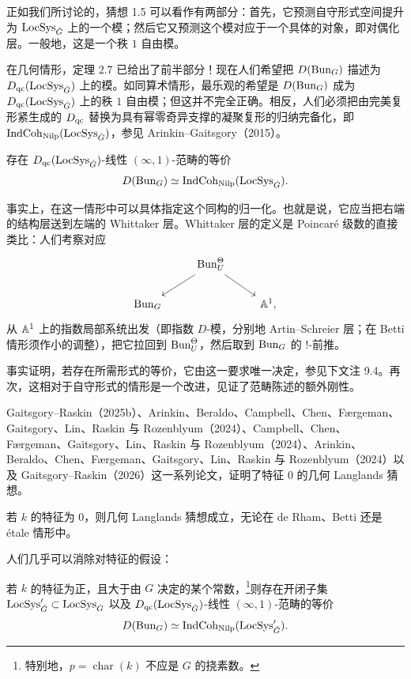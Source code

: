 正如我们所讨论的，猜想 1.5 可以看作有两部分：首先，它预测自守形式空间提升为 $\operatorname{LocSys}_{\check{G}}$ 上的一个模；然后它又预测这个模对应于一个具体的对象，即对偶化层。一般地，这是一个秩 $1$ 自由模。

在几何情形，定理 2.7 已给出了前半部分！现在人们希望把 $D(\operatorname{Bun}_G)$ 描述为 $D_{\mathrm{qc}}(\operatorname{LocSys}_{\check{G}})$ 上的模。如同算术情形，最乐观的希望是 $D(\operatorname{Bun}_G)$ 成为 $D_{\mathrm{qc}}(\operatorname{LocSys}_{\check{G}})$ 上的秩 $1$ 自由模；但这并不完全正确。相反，人们必须把由完美复形紧生成的 $D_{\mathrm{qc}}$ 替换为具有幂零奇异支撑的凝聚复形的归纳完备化，即 $\operatorname{IndCoh}_{\mathrm{Nilp}}(\operatorname{LocSys}_{\check{G}})$，参见 Arinkin–Gaitsgory（2015）。

\begin{conjecture}[几何 Langlands 猜想]
存在 $D_{\mathrm{qc}}(\operatorname{LocSys}_{\check{G}})$-线性 $(\infty,1)$-范畴的等价
\[
D(\operatorname{Bun}_G) \simeq \operatorname{IndCoh}_{\mathrm{Nilp}}(\operatorname{LocSys}_{\check{G}}).
\]
\end{conjecture}

事实上，在这一情形中可以具体指定这个同构的归一化。也就是说，它应当把右端的结构层送到左端的 Whittaker 层。Whittaker 层的定义是 Poincaré 级数的直接类比：人们考察对应
\[
\begin{tikzcd}
& \Bun_U^{\Theta} \arrow[dl] \arrow[dr] & \\
\Bun_G & & \A^1,
\end{tikzcd}
\]
从 $\mathbb{A}^1$ 上的指数局部系统出发（即指数 $D$-模，分别地 Artin–Schreier 层；在 Betti 情形须作小的调整），把它拉回到 $\operatorname{Bun}_U^{\Theta}$，然后取到 $\operatorname{Bun}_G$ 的 $!$-前推。

事实证明，若存在所需形式的等价，它由这一要求唯一决定，参见下文注 9.4。再次，这相对于自守形式的情形是一个改进，见证了范畴陈述的额外刚性。

Gaitsgory–Raskin（2025b）、Arinkin、Beraldo、Campbell、Chen、Færgeman、Gaitsgory、Lin、Raskin 与 Rozenblyum（2024）、Campbell、Chen、Færgeman、Gaitsgory、Lin、Raskin 与 Rozenblyum（2024）、Arinkin、Beraldo、Chen、Færgeman、Gaitsgory、Lin、Raskin 与 Rozenblyum（2024）以及 Gaitsgory–Raskin（2026）这一系列论文，证明了特征 $0$ 的几何 Langlands 猜想。

\begin{theorem}[几何 Langlands 定理，特征 $0$]
若 $k$ 的特征为 $0$，则几何 Langlands 猜想成立，无论在 de Rham、Betti 还是 étale 情形中。
\end{theorem}

人们几乎可以消除对特征的假设：

\begin{theorem}
若 $k$ 的特征为正，且大于由 $G$ 决定的某个常数，\footnote{特别地，$p = \operatorname{char}(k)$ 不应是 $G$ 的挠素数。}则存在开闭子集 $\operatorname{LocSys}'_{\check{G}} \subset \operatorname{LocSys}_{\check{G}}$ 以及 $D_{\mathrm{qc}}(\operatorname{LocSys}_{\check{G}})$-线性 $(\infty,1)$-范畴的等价
\[
D(\operatorname{Bun}_G) \simeq \operatorname{IndCoh}_{\mathrm{Nilp}}(\operatorname{LocSys}'_{\check{G}}).
\]
\end{theorem}

